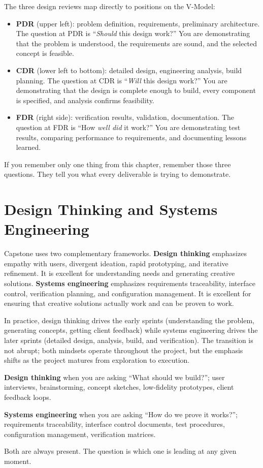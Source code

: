 The three design reviews map directly to positions on the V-Model:
\begin{itemize}[nosep,leftmargin=1.5em]
\item \textbf{PDR} (upper left): problem definition, requirements, preliminary architecture. The question at PDR is ``\emph{Should} this design work?'' You are demonstrating that the problem is understood, the requirements are sound, and the selected concept is feasible.
\item \textbf{CDR} (lower left to bottom): detailed design, engineering analysis, build planning. The question at CDR is ``\emph{Will} this design work?'' You are demonstrating that the design is complete enough to build, every component is specified, and analysis confirms feasibility.
\item \textbf{FDR} (right side): verification results, validation, documentation. The question at FDR is ``How \emph{well did} it work?'' You are demonstrating test results, comparing performance to requirements, and documenting lessons learned.
\end{itemize}

If you remember only one thing from this chapter, remember those three questions. They tell you what every deliverable is trying to demonstrate.


\section{Design Thinking and Systems Engineering}
Capstone uses two complementary frameworks. \textbf{Design thinking} emphasizes empathy with users, divergent ideation, rapid prototyping, and iterative refinement. It is excellent for understanding needs and generating creative solutions. \textbf{Systems engineering} emphasizes requirements traceability, interface control, verification planning, and configuration management. It is excellent for ensuring that creative solutions actually work and can be proven to work.

In practice, design thinking drives the early sprints (understanding the problem, generating concepts, getting client feedback) while systems engineering drives the later sprints (detailed design, analysis, build, and verification). The transition is not abrupt; both mindsets operate throughout the project, but the emphasis shifts as the project matures from exploration to execution.

\begin{keyconceptbox}
\textbf{Design thinking} when you are asking ``What should we build?''; user interviews, brainstorming, concept sketches, low-fidelity prototypes, client feedback loops.

\textbf{Systems engineering} when you are asking ``How do we prove it works?''; requirements traceability, interface control documents, test procedures, configuration management, verification matrices.

Both are always present. The question is which one is leading at any given moment.
\end{keyconceptbox}


